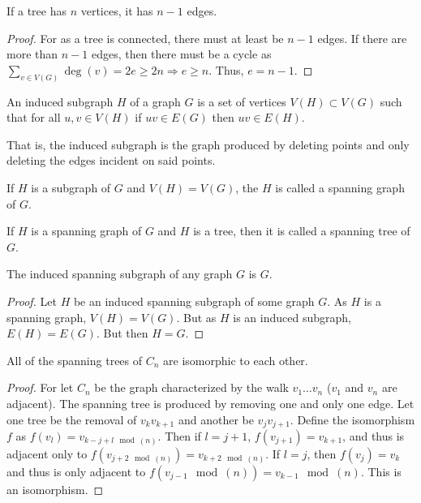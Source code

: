 \documentclass[crop=false,class=book,oneside]{standalone}
\begin{document}
        \begin{theorem}
        If a tree has $n$ vertices, it has $n-1$ edges.
        \end{theorem}
        \begin{proof} For as a tree is connected, there must at least be $n-1$ edges. If there are more than $n-1$ edges, then there must be a cycle as $\sum_{v\in V(G)} \deg(v) = 2e \geq 2n\Rightarrow e\geq n$. Thus, $e=n-1$. 
        \end{proof}
        \begin{definition}
        An induced subgraph $H$ of a graph $G$ is a set of vertices $V(H) \subset V(G)$ such that for all $u,v\in V(H)$ if $uv\in E(G)$ then $uv \in E(H)$.
        \end{definition}
        \begin{remark}
        That is, the induced subgraph is the graph produced by deleting points and only deleting the edges incident on said points.
        \end{remark}
        \begin{definition}
        If $H$ is a subgraph of $G$ and $V(H)=V(G)$, the $H$ is called a spanning graph of $G$.
        \end{definition}
        \begin{definition}
        If $H$ is a spanning graph of $G$ and $H$ is a tree, then it is called a spanning tree of $G$.
        \end{definition}
        \begin{corollary}
        The induced spanning subgraph of any graph $G$ is $G$.
        \end{corollary}
        \begin{proof}
        Let $H$ be an induced spanning subgraph of some graph $G$. As $H$ is a spanning graph, $V(H)=V(G)$. But as $H$ is an induced subgraph, $E(H)=E(G)$. But then $H=G$.
        \end{proof}
        \begin{theorem}
        All of the spanning trees of $C_n$ are isomorphic to each other.
        \end{theorem}
        \begin{proof}
        For let $C_n$ be the graph characterized by the walk $v_1\hdots v_n$ ($v_1$ and $v_n$ are adjacent). The spanning tree is produced by removing one and only one edge. Let one tree be the removal of $v_{k}v_{k+1}$ and another be $v_{j}v_{j+1}$. Define the isomorphism $f$ as $f(v_l) = v_{k-j+l \mod(n)}$. Then if $l=j+1$, $f(v_{j+1}) = v_{k+1}$, and thus is adjacent only to $f(v_{j+2 \mod(n)}) = v_{k+2\mod(n)}$. If $l=j$, then $f(v_j) = v_k$ and thus is only adjacent to $f(v_{j-1}\mod(n)) = v_{k-1}\mod(n)$. This is an isomorphism.
        \end{proof}
\end{document}
